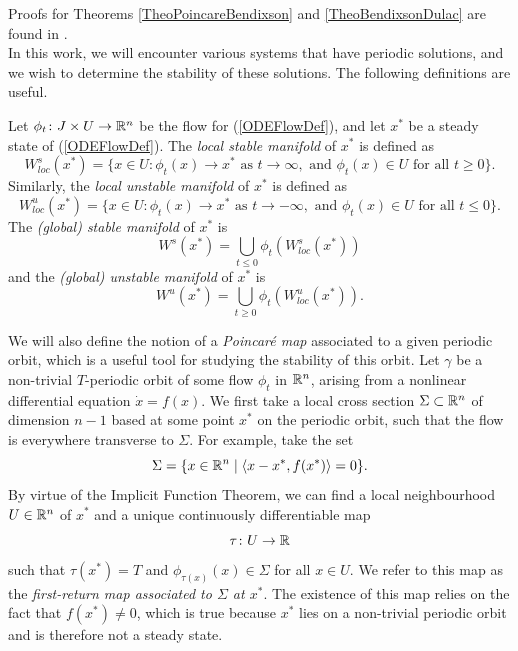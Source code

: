 \documentclass[12pt]{UOthesis}
\theoremstyle{remarkstyle}
\begin{document}
Proofs for Theorems \ref{TheoPoincareBendixson} and \ref{TheoBendixsonDulac} are found in \cite{Chicone}.\\

In this work, we will encounter various systems that have periodic solutions, and we wish to determine the stability of these solutions. The following definitions are useful.
\begin{defn}
	Let $\phi_t\colon J\times U\rightarrow \mathbb R^n$ be the flow for (\ref{ODEFlowDef}), and let $x^*$ be a steady state of (\ref{ODEFlowDef}). The \emph{local stable manifold} of $x^*$ is defined as
	\begin{equation}
	W_{loc}^s(x^*)=\{x\in U\colon \phi_t(x)\rightarrow x^*\text{ as }t\rightarrow\infty,\text{ and }\phi_t(x)\in U\text{ for all } t\ge 0\}.
	\label{DefLocStbMfd}
	\end{equation}
	Similarly, the \emph{local unstable manifold} of $x^*$ is defined as
	\begin{equation}
	W_{loc}^u(x^*)=\{x\in U\colon \phi_t(x)\rightarrow x^*\text{ as }t\rightarrow-\infty,\text{ and }\phi_t(x)\in U\text{ for all } t\le 0\}.
	\label{DefLocUnstbMfd}
	\end{equation}
	The \emph{(global) stable manifold} of $x^*$ is
	\begin{equation}
	W^s(x^*)=\bigcup_{t\le 0}\phi_t\left(W_{loc}^s(x^*)\right)
	\label{DefStbMfd}
	\end{equation}
	and the \emph{(global) unstable manifold} of $x^*$ is
	\begin{equation}
	W^u(x^*)=\bigcup_{t\ge 0}\phi_t\left(W_{loc}^u(x^*)\right).	
	\label{DefUnstbMfd}
	\end{equation}
\end{defn}

We will also define the notion of a \textit{Poincar\'e map} associated to a given periodic orbit, which is a useful tool for studying the stability of this orbit. Let $\gamma$ be a non-trivial $T$-periodic orbit of some flow $\phi_t$ in $\mathbb R^n$, arising from a nonlinear differential equation $\dot{x}=f(x)$. We first take a local cross section $\Sigma\subset \mathbb R^n$ of dimension $n-1$ based at some point $x^*$ on the periodic orbit, such that the flow is everywhere transverse to $\Sigma$. For example, take the set
$$\Sigma=\{x\in \mathbb R^n\mid \langle x-x^*,f(x^*)\rangle=0\}.$$
By virtue of the Implicit Function Theorem, we can find a local neighbourhood $U\in \mathbb R^n$ of $x^*$ and a unique continuously differentiable map
$$\tau\colon U\rightarrow \mathbb R$$
such that $\tau(x^*)=T$ and $\phi_{\tau(x)}(x)\in \Sigma$ for all $x\in U$. We refer to this map as the \textit{first-return map associated to $\Sigma$ at $x^*$}. The existence of this map relies on the fact that $f(x^*)\ne 0$, which is true because $x^*$ lies on a non-trivial periodic orbit and is therefore not a steady state.
\end{document}
